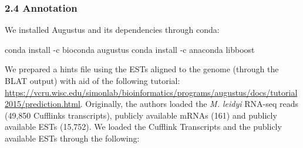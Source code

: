 \documentclass[
]{article}
\newenvironment{Shaded}{\begin{snugshade}}{\end{snugshade}}
\newcommand{\ExtensionTok}[1]{#1}
\newcommand{\NormalTok}[1]{#1}
\begin{document}
\hypertarget{annotation}{%
\subsubsection{2.4 Annotation}\label{annotation}}

We installed Augustus and its dependencies through conda:

\begin{Shaded}
\begin{Highlighting}[]

\ExtensionTok{conda}\NormalTok{ install {-}c bioconda augustus}
\ExtensionTok{conda}\NormalTok{ install {-}c anaconda libboost}
\end{Highlighting}
\end{Shaded}

We prepared a hints file using the ESTs aligned to the genome (through
the BLAT output) with aid of the following tutorial:
\url{https://vcru.wisc.edu/simonlab/bioinformatics/programs/augustus/docs/tutorial2015/prediction.html}.
Originally, the authors loaded the \emph{M. leidyi} RNA-seq reads
(49,850 Cufflinks transcripts), publicly available mRNAs (161) and
publicly available ESTs (15,752). We loaded the Cufflink Transcripts and
the publicly available ESTs through the following:
\end{document}
